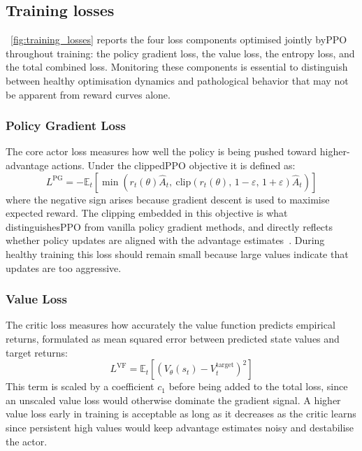 \subsection{Training losses}
\label{sec:training_dynamics_baseline_losses}

\figurename~\ref{fig:training_losses} reports the four loss components optimised jointly by\gls{PPO} throughout training: the policy gradient loss, the value loss, the entropy loss, and the total combined loss. Monitoring these components is essential to distinguish between healthy optimisation dynamics and pathological behavior that may not be apparent from reward curves alone.

\subsubsection{Policy Gradient Loss}
The core actor loss measures how well the policy is being pushed toward higher-advantage actions. Under the clipped\gls{PPO} objective it is defined as:
\begin{equation}
    L^{\mathrm{PG}} = -\mathbb{E}_t \left[ \min \left( r_t(\theta)\hat{A}_t,\ \mathrm{clip}(r_t(\theta),\, 1 - \varepsilon,\, 1 + \varepsilon)\hat{A}_t \right) \right]
\end{equation}
where the negative sign arises because gradient descent is used to maximise expected reward. The clipping embedded in this objective is what distinguishes\gls{PPO} from vanilla policy gradient methods, and directly reflects whether policy updates are aligned with the advantage estimates~\cite{schulman2017ppo}. During healthy training this loss should remain small because large values indicate that updates are too aggressive.

\subsubsection{Value Loss}
The critic loss measures how accurately the value function predicts empirical returns, formulated as mean squared error between predicted state values and target returns:
\begin{equation}
    L^{\mathrm{VF}} = \mathbb{E}_t \left[ \left( V_\theta(s_t) - V_t^{\mathrm{target}} \right)^2 \right]
\end{equation}
This term is scaled by a coefficient $c_1$ before being added to the total loss, since an unscaled value loss would otherwise dominate the gradient signal. A higher value loss early in training is acceptable as long as it decreases as the critic learns since persistent high values would keep advantage estimates noisy and destabilise the actor.

